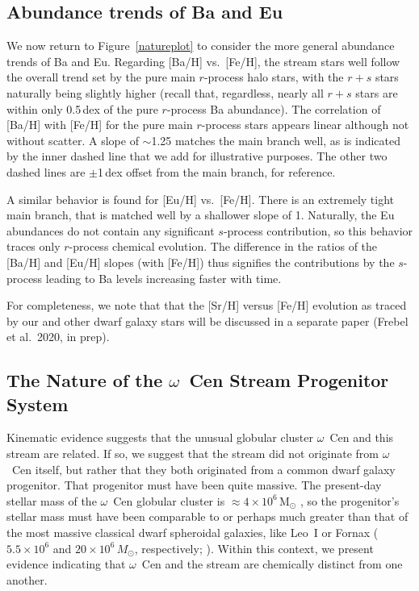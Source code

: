 \documentclass[twocolumn]{aastex63}
\begin{document}
\subsection{Abundance trends of Ba and Eu} \label{sr_ba_eu}



We now return to Figure~\ref{natureplot} to consider the more general abundance trends of Ba and Eu. Regarding [Ba/H] vs.\ [Fe/H], the stream stars well follow the overall trend set by the pure main $r$-process halo stars, with the $r+s$ stars naturally being slightly higher (recall that, regardless, nearly all $r+s$ stars are within only 0.5\,dex of the pure $r$-process Ba abundance). The correlation of [Ba/H] with [Fe/H] for the pure main $r$-process stars appears linear although not without scatter. A slope of $\sim$1.25 matches the main branch well, as is indicated by the inner dashed line that we add for illustrative purposes. The other two dashed lines are $\pm$1\,dex offset from the main branch, for reference.

A similar behavior is found for [Eu/H] vs.\ [Fe/H]. There is an extremely tight main branch, that is matched well by a shallower slope of 1. 
Naturally, the Eu abundances do not contain any significant $s$-process contribution, so this behavior traces only $r$-process chemical evolution. The difference in the ratios of the [Ba/H] and [Eu/H] slopes (with [Fe/H]) thus signifies the contributions by the $s$-process 
leading to Ba levels increasing faster with time. 

For completeness, we note that that the [Sr/H] versus [Fe/H] evolution as traced by our and other dwarf galaxy stars will be discussed in a separate paper (Frebel et al.\ 2020, in prep).

\subsection{The Nature of the $\omega$~Cen Stream Progenitor System}

Kinematic evidence suggests that the unusual globular cluster $\omega$~Cen and this stream are related.
If so, we suggest that the stream did not originate from $\omega$~Cen itself, but rather that they both originated from a common dwarf galaxy progenitor.
That progenitor must have been quite massive. The present-day stellar mass of the $\omega$~Cen globular cluster is $\approx 4 \times 10^{6}$\,M$_{\odot}$ \citep{dsouza13}, so the progenitor's stellar mass must have been comparable to or perhaps much greater than that of the most massive classical dwarf spheroidal galaxies, like Leo~I or Fornax ($5.5 \times 10^{6}$ and $20 \times 10^{6}$\,$M_{\odot}$, respectively; \citealt{mcconnachie12}). Within this context, we present evidence indicating that $\omega$~Cen and the stream are chemically distinct from one another.
\end{document}
